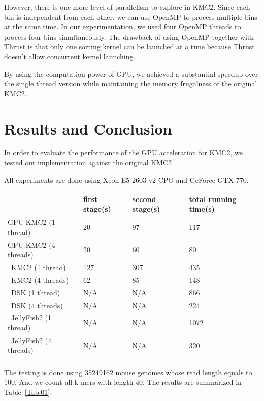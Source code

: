 \documentclass{bioinfo}
\begin{document}
\begin{methods}
However, there is one more level of parallelism to explore in KMC2. 
Since each bin is independent from each other, we can use OpenMP to process multiple bins at the same time. 
In our experimentation, we used four OpenMP threads to process four bins simultaneously. 
The drawback of using OpenMP together with Thrust is that only one sorting kernel can be launched at a time because Thrust doesn't allow concurrent kernel launching.

By using the computation power of GPU, we achieved a substantial speedup over the single thread version while maintaining the memory frugalness of the original KMC2.
\newline

\end{methods}



\section{Results and Conclusion}
In order to evaluate the performance of the GPU acceleration for KMC2, we tested our implementation against the original KMC2 \citep{Seb14}.

All experiments are done using Xeon E5-2603 v2 CPU and GeForce GTX 770.
\begin{table}[H]
 {\begin{tabular}{@{}llll@{}}\toprule  &
first stage(s) & second stage(s) & total running time(s)\\\midrule
GPU KMC2 (1 thread) & 20 & 97 & 117\\
GPU KMC2 (4 threads) & 20 & 60 & 80\\\
KMC2 (1 thread) & 127 & 307 & 435\\\
KMC2 (4 threads) & 62 & 85 & 148\\\
DSK (1 thread) & N/A & N/A & 866\\\
DSK (4 threads) & N/A & N/A & 224\\\
JellyFish2 (1 thread) & N/A & N/A & 1072\\\
JellyFish2 (4 threads) & N/A & N/A & 320\\\botrule
\end{tabular}}{}
\end{table}

The testing is done using 35249162 mouse genomes whose read length equals to 100. And we count all k-mers with length 40.
The results are summarized in Table~\ref{Tab:01}.
\end{document}

